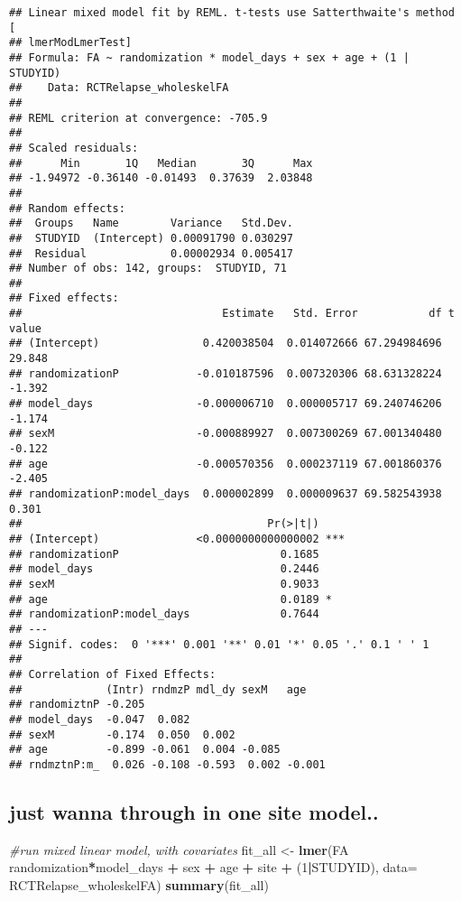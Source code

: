 \documentclass[]{article}
\newenvironment{Shaded}{\begin{snugshade}}{\end{snugshade}}
\newcommand{\KeywordTok}[1]{\textcolor[rgb]{0.13,0.29,0.53}{\textbf{#1}}}
\newcommand{\DataTypeTok}[1]{\textcolor[rgb]{0.13,0.29,0.53}{#1}}
\newcommand{\DecValTok}[1]{\textcolor[rgb]{0.00,0.00,0.81}{#1}}
\newcommand{\StringTok}[1]{\textcolor[rgb]{0.31,0.60,0.02}{#1}}
\newcommand{\CommentTok}[1]{\textcolor[rgb]{0.56,0.35,0.01}{\textit{#1}}}
\newcommand{\OperatorTok}[1]{\textcolor[rgb]{0.81,0.36,0.00}{\textbf{#1}}}
\newcommand{\NormalTok}[1]{#1}
\theoremstyle{definition}
\theoremstyle{definition}
\theoremstyle{definition}
\theoremstyle{remark}
\begin{document}
\begin{verbatim}
## Linear mixed model fit by REML. t-tests use Satterthwaite's method [
## lmerModLmerTest]
## Formula: FA ~ randomization * model_days + sex + age + (1 | STUDYID)
##    Data: RCTRelapse_wholeskelFA
## 
## REML criterion at convergence: -705.9
## 
## Scaled residuals: 
##      Min       1Q   Median       3Q      Max 
## -1.94972 -0.36140 -0.01493  0.37639  2.03848 
## 
## Random effects:
##  Groups   Name        Variance   Std.Dev.
##  STUDYID  (Intercept) 0.00091790 0.030297
##  Residual             0.00002934 0.005417
## Number of obs: 142, groups:  STUDYID, 71
## 
## Fixed effects:
##                               Estimate   Std. Error           df t value
## (Intercept)                0.420038504  0.014072666 67.294984696  29.848
## randomizationP            -0.010187596  0.007320306 68.631328224  -1.392
## model_days                -0.000006710  0.000005717 69.240746206  -1.174
## sexM                      -0.000889927  0.007300269 67.001340480  -0.122
## age                       -0.000570356  0.000237119 67.001860376  -2.405
## randomizationP:model_days  0.000002899  0.000009637 69.582543938   0.301
##                                      Pr(>|t|)    
## (Intercept)               <0.0000000000000002 ***
## randomizationP                         0.1685    
## model_days                             0.2446    
## sexM                                   0.9033    
## age                                    0.0189 *  
## randomizationP:model_days              0.7644    
## ---
## Signif. codes:  0 '***' 0.001 '**' 0.01 '*' 0.05 '.' 0.1 ' ' 1
## 
## Correlation of Fixed Effects:
##             (Intr) rndmzP mdl_dy sexM   age   
## randomiztnP -0.205                            
## model_days  -0.047  0.082                     
## sexM        -0.174  0.050  0.002              
## age         -0.899 -0.061  0.004 -0.085       
## rndmztnP:m_  0.026 -0.108 -0.593  0.002 -0.001
\end{verbatim}

\subsection{just wanna through in one site
model..}\label{just-wanna-through-in-one-site-model..}

\begin{Shaded}
\begin{Highlighting}[]
\CommentTok{#run mixed linear model, with covariates}
\NormalTok{fit_all <-}\StringTok{ }\KeywordTok{lmer}\NormalTok{(FA }\OperatorTok{~}\StringTok{ }\NormalTok{randomization}\OperatorTok{*}\NormalTok{model_days }\OperatorTok{+}\StringTok{ }\NormalTok{sex }\OperatorTok{+}\StringTok{ }\NormalTok{age }\OperatorTok{+}\StringTok{ }\NormalTok{site }\OperatorTok{+}\StringTok{ }\NormalTok{(}\DecValTok{1}\OperatorTok{|}\NormalTok{STUDYID), }\DataTypeTok{data=}\NormalTok{ RCTRelapse_wholeskelFA)}
\KeywordTok{summary}\NormalTok{(fit_all)}
\end{Highlighting}
\end{Shaded}
\end{document}
